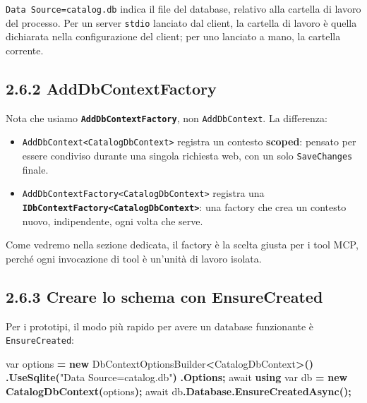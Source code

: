 \documentclass[
  italian,
  10pt,
]{book}
\newenvironment{Shaded}{\begin{snugshade}}{\end{snugshade}}
\newcommand{\DataTypeTok}[1]{\textcolor[rgb]{0.13,0.29,0.53}{#1}}
\newcommand{\FunctionTok}[1]{\textcolor[rgb]{0.13,0.29,0.53}{\textbf{#1}}}
\newcommand{\KeywordTok}[1]{\textcolor[rgb]{0.13,0.29,0.53}{\textbf{#1}}}
\newcommand{\NormalTok}[1]{#1}
\newcommand{\OperatorTok}[1]{\textcolor[rgb]{0.81,0.36,0.00}{\textbf{#1}}}
\newcommand{\StringTok}[1]{\textcolor[rgb]{0.31,0.60,0.02}{#1}}
\providecommand{\tightlist}{%
  \setlength{\itemsep}{0pt}\setlength{\parskip}{0pt}}
\begin{document}
\texttt{Data\ Source=catalog.db} indica il file del database, relativo
alla cartella di lavoro del processo. Per un server \texttt{stdio}
lanciato dal client, la cartella di lavoro è quella dichiarata nella
configurazione del client; per uno lanciato a mano, la cartella
corrente.

\subsection{2.6.2 AddDbContextFactory}\label{adddbcontextfactory}

Nota che usiamo \textbf{\texttt{AddDbContextFactory}}, non
\texttt{AddDbContext}. La differenza:

\begin{itemize}
\tightlist
\item
  \texttt{AddDbContext\textless{}CatalogDbContext\textgreater{}}
  registra un contesto \textbf{scoped}: pensato per essere condiviso
  durante una singola richiesta web, con un solo \texttt{SaveChanges}
  finale.
\item
  \texttt{AddDbContextFactory\textless{}CatalogDbContext\textgreater{}}
  registra una
  \textbf{\texttt{IDbContextFactory\textless{}CatalogDbContext\textgreater{}}}:
  una factory che crea un contesto nuovo, indipendente, ogni volta che
  serve.
\end{itemize}

Come vedremo nella sezione dedicata, il factory è la scelta giusta per i
tool MCP, perché ogni invocazione di tool è un'unità di lavoro isolata.

\subsection{2.6.3 Creare lo schema con
EnsureCreated}\label{creare-lo-schema-con-ensurecreated}

Per i prototipi, il modo più rapido per avere un database funzionante è
\texttt{EnsureCreated}:

\begin{Shaded}
\begin{Highlighting}[]
\DataTypeTok{var}\NormalTok{ options }\OperatorTok{=} \KeywordTok{new}\NormalTok{ DbContextOptionsBuilder}\OperatorTok{\textless{}}\NormalTok{CatalogDbContext}\OperatorTok{\textgreater{}()}
    \OperatorTok{.}\FunctionTok{UseSqlite}\OperatorTok{(}\StringTok{"Data Source=catalog.db"}\OperatorTok{)}
    \OperatorTok{.}\FunctionTok{Options}\OperatorTok{;}
\NormalTok{await }\KeywordTok{using} \DataTypeTok{var}\NormalTok{ db }\OperatorTok{=} \KeywordTok{new} \FunctionTok{CatalogDbContext}\OperatorTok{(}\NormalTok{options}\OperatorTok{);}
\NormalTok{await db}\OperatorTok{.}\FunctionTok{Database}\OperatorTok{.}\FunctionTok{EnsureCreatedAsync}\OperatorTok{();}
\end{Highlighting}
\end{Shaded}
\end{document}

